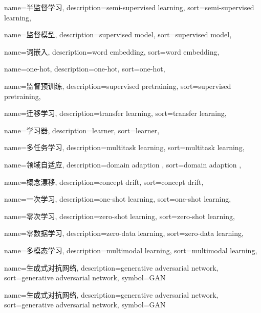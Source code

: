 {
  name=半监督学习,
  description={semi-supervised learning},
  sort={semi-supervised learning},
}

{
  name=监督模型,
  description={supervised model},
  sort={supervised model},
}

{
  name=词嵌入,
  description={word embedding},
  sort={word embedding},
}

{
  name=one-hot,
  description={one-hot},
  sort={one-hot},
}

{
  name=监督预训练,
  description={supervised pretraining},
  sort={supervised pretraining},
}

{
  name=迁移学习,
  description={transfer learning},
  sort={transfer learning},
}

{
  name=学习器,
  description={learner},
  sort={learner},
}

{
  name=多任务学习,
  description={multitask learning},
  sort={multitask learning},
}

{
  name=领域自适应,
  description={domain adaption}  ,
  sort={domain adaption}  ,
}

{
  name=概念漂移,
  description={concept drift},
  sort={concept drift},
}

{
  name=一次学习,
  description={one-shot learning},
  sort={one-shot learning},
}

{
  name=零次学习,
  description={zero-shot learning},
  sort={zero-shot learning},
}

{
  name=零数据学习,
  description={zero-data learning},
  sort={zero-data learning},
}

{
  name=多模态学习,
  description={multimodal learning},
  sort={multimodal learning},
}

{
  name=生成式对抗网络,
  description={generative adversarial network},
  sort={generative adversarial network},
  symbol={GAN}
}

{
  name=生成式对抗网络,
  description={generative adversarial network},
  sort={generative adversarial network},
  symbol={GAN}
}

